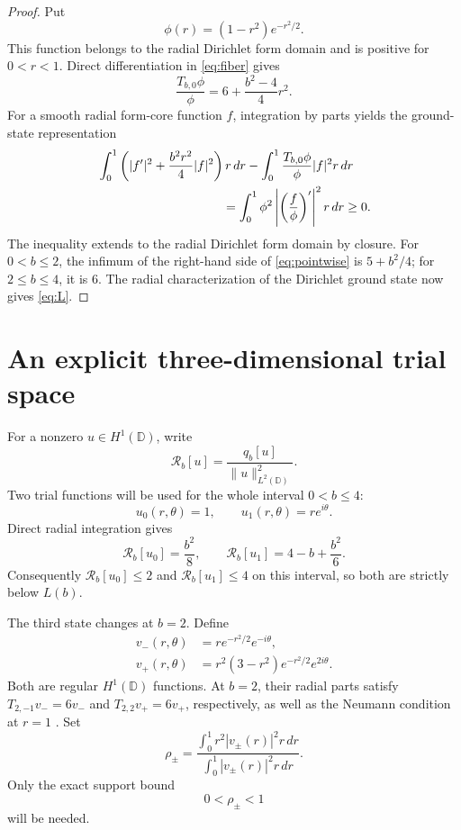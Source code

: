 \documentclass[11pt]{article}
\newcommand{\D}{\mathbb D}
\newcommand{\qb}{q_b}
\newcommand{\Rb}{\mathcal R_b}
\begin{document}
\begin{proof}
Put
\[
  \phi(r)=(1-r^2)e^{-r^2/2}.
\]
This function belongs to the radial Dirichlet form domain and is positive
for $0<r<1$.  Direct differentiation in \eqref{eq:fiber} gives
\begin{equation}\label{eq:pointwise}
  \frac{T_{b,0}\phi}{\phi}
  =6+\frac{b^2-4}{4}r^2.
\end{equation}
For a smooth radial form-core function $f$, integration by parts yields the
ground-state representation
\begin{equation}\label{eq:gst}
\begin{aligned}
 &\int_0^1\left(|f'|^2+\frac{b^2r^2}{4}|f|^2\right)r\,dr
 -\int_0^1\frac{T_{b,0}\phi}{\phi}|f|^2r\,dr \\
 &\hspace{35mm}=
 \int_0^1\phi^2\left|\left(\frac f\phi\right)'\right|^2r\,dr\geq0.
\end{aligned}
\end{equation}
The inequality extends to the radial Dirichlet form domain by closure.  For
$0<b\leq2$, the infimum of the right-hand side of
\eqref{eq:pointwise} is $5+b^2/4$; for $2\leq b\leq4$, it is $6$.
The radial characterization of the Dirichlet ground state now gives
\eqref{eq:L}.
\end{proof}

\section{An explicit three-dimensional trial space}

For a nonzero $u\in H^1(\D)$, write
\[
  \Rb[u]=\frac{\qb[u]}{\|u\|_{L^2(\D)}^2}.
\]
Two trial functions will be used for the whole interval $0<b\leq4$:
\[
  u_0(r,\theta)=1,\qquad
  u_1(r,\theta)=re^{i\theta}.
\]
Direct radial integration gives
\begin{equation}\label{eq:twoR}
  \Rb[u_0]=\frac{b^2}{8},\qquad
  \Rb[u_1]=4-b+\frac{b^2}{6}.
\end{equation}
Consequently $\Rb[u_0]\leq2$ and $\Rb[u_1]\leq4$ on this interval,
so both are strictly below $L(b)$.

The third state changes at $b=2$.  Define
\begin{align*}
  v_-(r,\theta)&=re^{-r^2/2}e^{-i\theta},\\
  v_+(r,\theta)&=r^2(3-r^2)e^{-r^2/2}e^{2i\theta}.
\end{align*}
Both are regular $H^1(\D)$ functions.  At $b=2$, their radial parts satisfy
$T_{2,-1}v_-=6v_-$ and $T_{2,2}v_+=6v_+$, respectively, as well as the
Neumann condition at $r=1$ \cite[Sec.~5]{Lotoreichik2025}.  Set
\begin{equation}\label{eq:rho}
  \rho_\pm=
  \frac{\int_0^1r^2|v_\pm(r)|^2r\,dr}
       {\int_0^1|v_\pm(r)|^2r\,dr}.
\end{equation}
Only the exact support bound
\begin{equation}\label{eq:rho-range}
  0<\rho_\pm<1
\end{equation}
will be needed.
\end{document}
